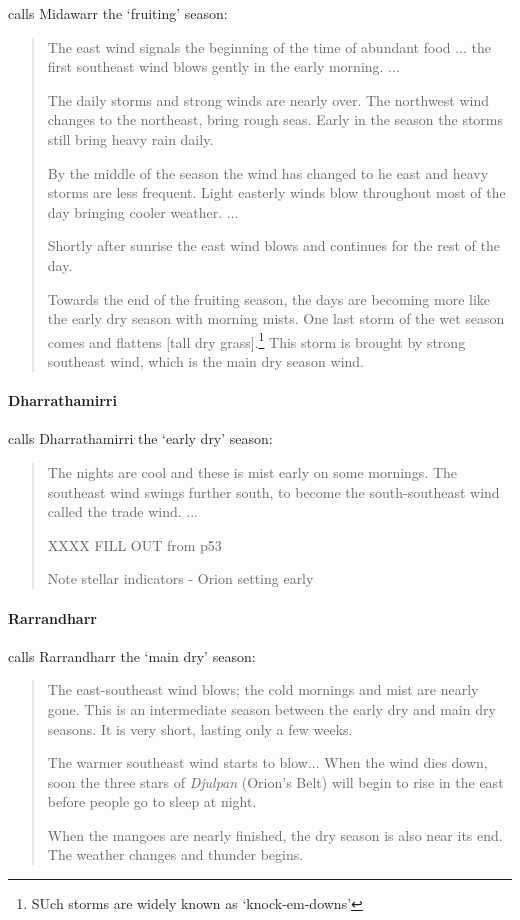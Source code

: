 \citet{davis1989} calls Midawarr the `fruiting' season:
\blockquote{
    The east wind signals the beginning of the time of abundant food ... the first southeast wind blows gently in the early morning. ...
    
    The daily storms and strong winds are nearly over.  The northwest wind changes to the northeast, bring rough seas.
    Early in the season the storms still bring heavy rain daily.
    
    By the middle of the season the wind has changed to he east and heavy storms are less frequent.
    Light easterly winds blow throughout most of the day bringing cooler weather. ...
    
    Shortly after sunrise the east wind blows and continues for the rest of the day.
    
    Towards the end of the fruiting season, the days are becoming more like the early dry season with morning mists.
    One last storm of the wet season comes and flattens [tall dry grass].\footnote{SUch storms are widely known as `knock-em-downs'}
    This storm is brought by strong southeast wind, which is the main dry season wind.
}


\paragraph{Dharrathamirri}

\citet{davis1989} calls Dharrathamirri the `early dry' season:
\blockquote{
    The nights are cool and these is mist early on some mornings.
    The southeast wind swings further south, to become the south-southeast wind called the trade wind. ...
    
    XXXX FILL OUT from p53
    
    Note stellar indicators - Orion setting early
}


\paragraph{Rarrandharr}

\citet{davis1989} calls Rarrandharr the `main dry' season:
\blockquote{
    The east-southeast wind blows; the cold mornings and mist are nearly gone.
    This is an intermediate season between the early dry and main dry seasons.
    It is very short, lasting only a few weeks.
    
    The warmer southeast wind starts to blow...
    When the wind dies down, soon the three stars of \textit{Djulpan} (Orion's Belt) will begin to rise in the east before people go to sleep at night.
    
    When the mangoes are nearly finished, the dry season is also near its end.
    The weather changes and thunder begins.
}








